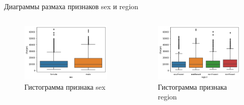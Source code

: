 \documentclass[c]{beamer}  %
\begin{document}
	\begin{frame}
		\frametitle{\insertsection}

		\begin{block}{Диаграммы размаха признаков sex и region}
			\begin{columns}[onlytextwidth,T]
				\begin{figure}[H]
					\centering
					\includegraphics[scale=0.35]{sex_boxplot.png}
					\caption{Гистограмма признака sex}
					\label{img:sex_boxplot}
				\end{figure}
				\begin{figure}[H]
					\centering
					\includegraphics[scale=0.35]{region_boxplot.png}
					\caption{Гистограмма признака region}
					\label{img:region_boxplot}
				\end{figure}
			\end{columns}
		\end{block}
	\end{frame}
\end{document}

